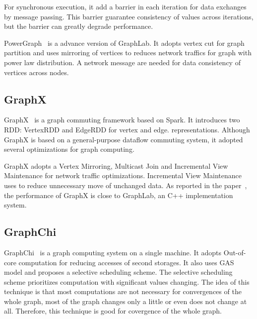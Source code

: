 For synchronous execution, it add a barrier in each
iteration for data exchanges by message passing.
This barrier guarantee consistency of values across
iterations, but the barrier can greatly degrade performance.

PowerGraph~\cite{powergraph} is a advance version of GraphLab.
It adopts vertex cut for graph partition and uses mirroring
of vertices to reduces network traffics for graph with power
law distribution. A network message are needed for data consistency of
vertices across nodes.

\subsection{GraphX}
GraphX~\cite{graphx} is a graph commuting framework based on Spark.
It introduces two RDD: VertexRDD and EdgeRDD for vertex and edge.
representations. Although GraphX is based on a general-purpose
dataflow commuting system, it adopted several optimizations for
graph computing.

GraphX adopts a Vertex Mirroring, Multicast Join and Incremental
View Maintenance
for network traffic optimizations.
Incremental View Maintenance uses to reduce unnecessary
move of unchanged data. As reported in the paper~\cite{graphx},
the performance of GraphX is close to GraphLab, an C++ implementation
system.

\subsection{GraphChi}
GraphChi~\cite{graphchi} is a graph computing system on a single machine.
It adopts Out-of-core computation for reducing accesses of second storages.
It also uses GAS model and proposes a selective scheduling scheme.
The selective scheduling scheme prioritizes computation with significant
values changing. The idea of this technique is that
most computations are not necessary for convergences of the whole graph,
most of the graph changes only a little or even does not change at all.
Therefore, this technique is good for covergence of the whole graph.
